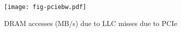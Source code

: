 \begin{figure}[t]
\texttt{[image: fig-pciebw.pdf]}
\caption{DRAM accesses (MB/s) due to LLC misses due to PCIe}
\label{fig:pciebw}
\end{figure}
